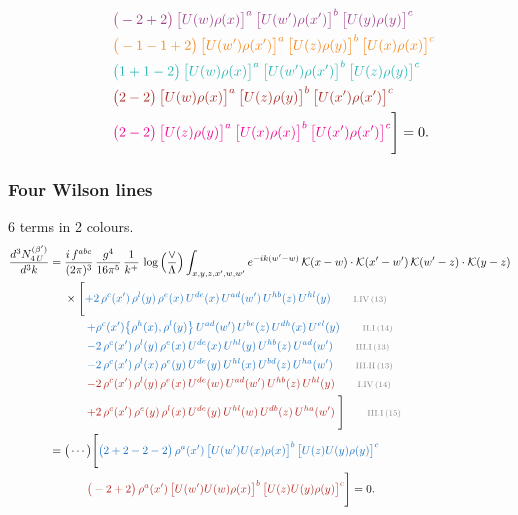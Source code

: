 \documentclass[10pt]{article}
\begin{document}
\begin{align}
&\qquad{\color{DarkOrchid}\big(-2+2\big)\,\big[U(w)\rho(x)\big]^{a}\,\big[U(w')\rho(x')\big]^{b}\,\big[U(y)\rho(y)\big]^{c}}\notag\\
&\qquad{\color{BurntOrange}\big(-1-1+2\big)\,\big[U(w')\rho(x')\big]^{a}\,\big[U(z)\rho(y)\big]^{b}\,\big[U(x)\rho(x)\big]^{c}}\notag\\
&\qquad{\color{TealBlue}\big(1+1-2\big)\,\big[U(w)\rho(x)\big]^{a}\,\big[U(w')\rho(x')\big]^{b}\,\big[U(z)\rho(y)\big]^{c}}\notag\\
&\qquad{\color{Mahogany}\big(2-2\big)\,\big[U(w)\rho(x)\big]^{a}\,\big[U(z)\rho(y)\big]^{b}\,\big[U(x')\rho(x')\big]^{c}}\notag\\
&\qquad{\color{Magenta}\big(2-2\big)\,\big[U(z)\rho(y)\big]^{a}\,\big[U(x)\rho(x)\big]^{b}\,\big[U(x')\rho(x')\big]^{c}}\Bigg]=0.
\end{align}
\subsubsection{Four Wilson lines}
6 terms in 2 colours.
\begin{align}
\frac{d^{3}N^{(\beta')}_{4\,U}}{d^{3}k}={}&\frac{i\,f^{abc}}{(2\pi)^{3}}\,\frac{g^{4}}{16\pi^{5}}\,\frac{1}{k^{+}}\,\log\Big(\frac{\vee}{\Lambda}\Big)\int_{x,y,z,x',w,w'}e^{-ik(w'-w)}\,\mathcal{K}(x-w)\cdot\mathcal{K}(x'-w')\,\mathcal{K}(w'-z)\cdot\mathcal{K}(y-z)\notag\\
&\times\Bigg[{\color{RoyalBlue}+2\,\rho^{c}(x')\,\rho^{l}(y)\,\rho^{e}(x)\,U^{de}(x)\,U^{ad}(w')\,U^{hb}(z)\,U^{hl}(y)}\tag*{\color{gray}\scriptsize I.IV\,(13)}\\
&\qquad{\color{RoyalBlue}+\rho^{c}(x')\big\{\rho^{h}(x),\rho^{l}(y)\big\}\,U^{ad}(w')\,U^{be}(z)\,U^{dh}(x)\,U^{el}(y)}\tag*{\color{gray}\scriptsize II.I\,(14)}\\
&\qquad{\color{RoyalBlue}-2\,\rho^{c}(x')\,\rho^{l}(y)\,\rho^{e}(x)\,U^{de}(x)\,U^{hl}(y)\,U^{hb}(z)\,U^{ad}(w')}\tag*{\color{gray}\scriptsize III.I\,(13)}\\
&\qquad{\color{RoyalBlue}-2\,\rho^{c}(x')\,\rho^{l}(x)\,\rho^{e}(y)\,U^{de}(y)\,U^{hl}(x)\,U^{bd}(z)\,U^{ha}(w')}\tag*{\color{gray}\scriptsize III.II\,(13)}\\
&\qquad{\color{BrickRed}-2\,\rho^{c}(x')\,\rho^{l}(y)\,\rho^{e}(x)\,U^{de}(w)\,U^{ad}(w')\,U^{hb}(z)\,U^{hl}(y)}\tag*{\color{gray}\scriptsize I.IV\,(14)}\\
&\qquad{\color{BrickRed}+2\,\rho^{c}(x')\,\rho^{e}(y)\,\rho^{l}(x)\,U^{de}(y)\,U^{hl}(w)\,U^{db}(z)\,U^{ha}(w')}\;\Bigg]\tag*{\color{gray}\scriptsize III.I\,(15)}\\
={}&\big(\cdots\big)\Bigg[{\color{RoyalBlue}\big(2+2-2-2\big)\,\rho^{a}(x')\,\big[U(w')U(x)\rho(x)\big]^{b}\,\big[U(z)U(y)\rho(y)\big]^{c}}\notag\\
&\qquad{\color{BrickRed}\big(-2+2\big)\,\rho^{a}(x')\,\big[U(w')U(w)\rho(x)\big]^{b}\,\big[U(z)U(y)\rho(y)\big]^{c}}\Bigg]=0.
\end{align}
\end{document}
